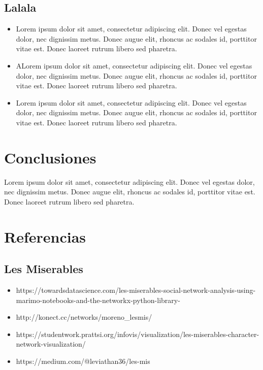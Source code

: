 \documentclass[conference]{IEEEtran}
\begin{document}
\subsection{Lalala}
\begin{itemize}
\item Lorem ipsum dolor sit amet, consectetur adipiscing elit. Donec vel egestas dolor, nec dignissim metus. Donec augue elit, rhoncus ac sodales id, porttitor vitae est. Donec laoreet rutrum libero sed pharetra.
\item ALorem ipsum dolor sit amet, consectetur adipiscing elit. Donec vel egestas dolor, nec dignissim metus. Donec augue elit, rhoncus ac sodales id, porttitor vitae est. Donec laoreet rutrum libero sed pharetra.
\item Lorem ipsum dolor sit amet, consectetur adipiscing elit. Donec vel egestas dolor, nec dignissim metus. Donec augue elit, rhoncus ac sodales id, porttitor vitae est. Donec laoreet rutrum libero sed pharetra.
\end{itemize}

\section{Conclusiones}
Lorem ipsum dolor sit amet, consectetur adipiscing elit. Donec vel egestas dolor, nec dignissim metus. Donec augue elit, rhoncus ac sodales id, porttitor vitae est. Donec laoreet rutrum libero sed pharetra.

\section{Referencias}
\subsection {Les Miserables}
\begin{itemize}
    \item https://towardsdatascience.com/les-miserables-social-network-analysis-using-marimo-notebooks-and-the-networkx-python-library-%
    \item http://konect.cc/networks/moreno_lesmis/
    \item https://studentwork.prattsi.org/infovis/visualization/les-miserables-character-network-visualization/
    \item https://medium.com/@leviathan36/les-mis%
\end{itemize}
\end{document}

